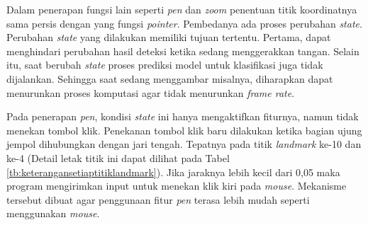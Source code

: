 

% 
Dalam penerapan fungsi lain seperti \emph{pen} dan \emph{zoom} penentuan titik koordinatnya sama persis dengan yang fungsi \emph{pointer}. Pembedanya ada proses perubahan \emph{state}. Perubahan \emph{state} yang dilakukan memiliki tujuan tertentu. Pertama, dapat menghindari perubahan hasil deteksi ketika sedang menggerakkan tangan. Selain itu, saat berubah \emph{state} proses prediksi model untuk klasifikasi juga tidak dijalankan. Sehingga saat sedang menggambar misalnya, diharapkan dapat menurunkan proses komputasi agar tidak menurunkan \emph{frame rate}.

Pada penerapan \emph{pen}, kondisi \emph{state} ini hanya mengaktifkan fiturnya, namun tidak menekan tombol klik. Penekanan tombol klik baru dilakukan ketika bagian ujung jempol dihubungkan dengan jari tengah. Tepatnya pada titik \emph{landmark} ke-10 dan ke-4 (Detail letak titik ini dapat dilihat pada Tabel \ref{tb:keterangansetiaptitiklandmark}). Jika jaraknya lebih kecil dari 0,05 maka program mengirimkan input untuk menekan klik kiri pada \emph{mouse}. Mekanisme tersebut dibuat agar penggunaan fitur \emph{pen} terasa lebih mudah seperti menggunakan \emph{mouse}.




